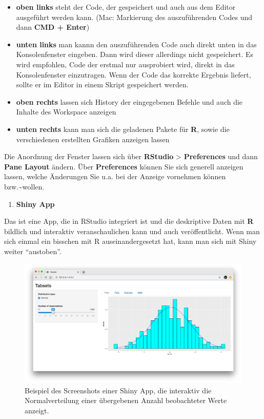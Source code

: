 \documentclass[]{book}
\providecommand{\tightlist}{%
  \setlength{\itemsep}{0pt}\setlength{\parskip}{0pt}}
\begin{document}
\begin{itemize}
\tightlist
\item
  \textbf{oben links} steht der Code, der gespeichert und auch aus dem
  Editor ausgeführt werden kann. (Mac: Markierung des auszuführenden
  Codes und dann \textbf{CMD + Enter})
\item
  \textbf{unten links} man kannn den auszuführenden Code auch direkt
  unten in das Konsolenfenster eingeben. Dann wird dieser allerdings
  nicht gespeichert. Es wird empfohlen, Code der erstmal nur ausprobiert
  wird, direkt in das Konsolenfenster einzutragen. Wenn der Code das
  korrekte Ergebnis liefert, sollte er im Editor in einem Skript
  gespeichert werden.
\item
  \textbf{oben rechts} lassen sich History der eingegebenen Befehle und
  auch die Inhalte des Workspace anzeigen
\item
  \textbf{unten rechts} kann man sich die geladenen Pakete für
  \textbf{R}, sowie die verschiedenen erstellten Grafiken anzeigen
  lassen
\end{itemize}

Die Anordnung der Fenster lassen sich über \textbf{RStudio}
\textgreater{} \textbf{Preferences} und dann \textbf{Pane Layout}
ändern. Über \textbf{Preferences} können Sie sich generell anzeigen
lassen, welche Änderungen Sie u.a. bei der Anzeige vornehmen können
bzw.\textasciitilde{}wollen.

\begin{enumerate}
\def\labelenumi{\arabic{enumi}.}
\setcounter{enumi}{2}
\tightlist
\item
  \textbf{Shiny App}
\end{enumerate}

Das ist eine App, die in RStudio integriert ist und die deskriptive
Daten mit \textbf{R} bildlich und interaktiv veranschaulichen kann und
auch veröffentlicht. Wenn man sich einmal ein bisschen mit R
auseinandergesetzt hat, kann man sich mit Shiny weiter ``austoben''.

\begin{figure}
\centering
\includegraphics{./img/Shiny-Example.png}
\caption{Beispiel des Screenshots einer Shiny App, die interaktiv die
Normalverteilung einer übergebenen Anzahl beobachteter Werte anzeigt.}
\end{figure}
\end{document}
